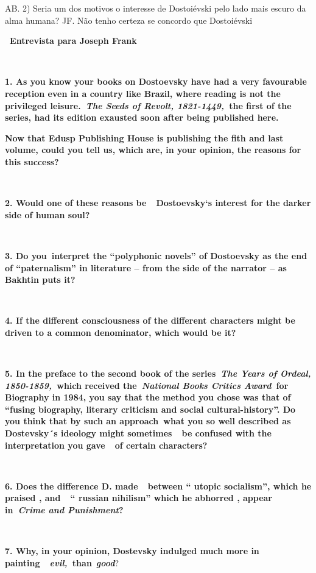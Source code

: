 AB. 2) Seria um dos motivos o interesse de Dostoiévski pelo lado mais
escuro da alma humana? JF. Não tenho certeza se concordo que Dostoiévski

\textbf{~Entrevista para Joseph Frank~}

\textbf{~}

\textbf{1. As you know your books on Dostoevsky have had a very
favourable reception even in a country like Brazil, where reading is not
the privileged leisure.~\emph{The Seeds of Revolt, 1821-1449,~}the first
of the series, had its edition exausted soon after being published
here.}

\textbf{Now that Edusp Publishing House is publishing the fith and last
volume, could you tell us, which are, in your opinion, the reasons for
this success?}

\textbf{~}

\textbf{2. Would one of these reasons be~~Dostoevsky`s interest for the
darker side of human soul?}

\textbf{~}

\textbf{3. Do you~interpret the ``polyphonic novels'' of Dostoevsky as
the end of ``paternalism'' in literature -- from the side of the
narrator -- as Bakhtin puts it?}

\textbf{~}

\textbf{4. If the different consciousness of the different characters
might be driven to a common denominator, which would be it?}

\textbf{~}

\textbf{5. In the preface to the second book of the series~\emph{The
Years of Ordeal, 1850-1859,~}which received the~\emph{National Books
Critics Award}~for Biography in 1984, you say that the method you chose
was that of ``fusing biography, literary criticism and social
cultural-history''. Do you think that by such an approach~what you so
well described as Dostevsky´s ideology might sometimes~~be confused with
the interpretation you gave~~of certain characters?}

\textbf{~}

\textbf{6. Does the difference D. made~~between `` utopic socialism'',
which he praised , and~~`` russian nihilism'' which he abhorred , appear
in~\emph{Crime and Punishment}?}

\textbf{~}

\textbf{7. Why, in your opinion, Dostevsky indulged much more in
painting~~\emph{evil,~}than}~\emph{\textbf{good}}?

~

